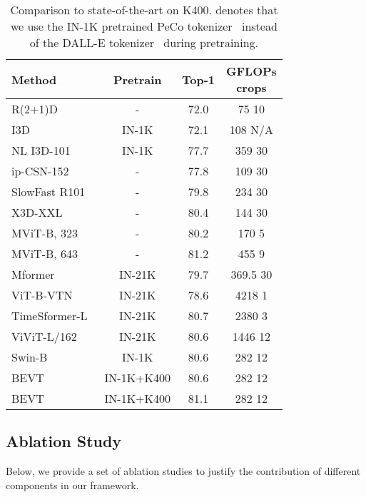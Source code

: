 \documentclass[10pt,twocolumn,letterpaper]{article}
\newcommand{\kn}{{\scshape K400}\xspace}
\newcommand{\ra}[1]{\renewcommand{\arraystretch}{#1}}
\begin{document}
\begin{table}
  \centering
\setlength{\tabcolsep}{0pt} \ra{1.0}
  \begin{tabular*}{\linewidth}{@{\extracolsep{\fill}}lccc@{}}
    \toprule
    Method & Pretrain & Top-1 & \makecell[c]{GFLOPs \\  crops} \\
    \midrule
    R(2+1)D~\cite{r21d} & - & 72.0 & 75  10 \\
    I3D~\cite{quovadis} & IN-1K & 72.1 & 108  N/A \\
    NL I3D-101~\cite{nonlocal} & IN-1K & 77.7 & 359  30 \\
    ip-CSN-152~\cite{tran2019video} & - & 77.8 & 109  30 \\
    SlowFast R101~\cite{slowfast} & - & 79.8 & 234  30 \\
    X3D-XXL~\cite{x3d} & - & 80.4 & 144  30 \\
    \midrule
    MViT-B, 323~\cite{fan2021multiscale} & - & 80.2 & 170  5 \\
    MViT-B, 643~\cite{fan2021multiscale} & - & 81.2 & 455  9 \\
    Mformer~\cite{patrick2021keeping} & IN-21K & 79.7 & 369.5  30 \\
    ViT-B-VTN~\cite{neimark2021video} & IN-21K & 78.6 & 4218  1 \\
    TimeSformer-L~\cite{gberta_2021_ICML} & IN-21K & 80.7 & 2380  3 \\
    ViViT-L/162~\cite{arnab2021vivit} & IN-21K & 80.6 & 1446  12 \\
Swin-B~\cite{liu2021video} & IN-1K & 80.6 & 282  12 \\
    \midrule
BEVT & IN-1K+K400 & 80.6 & 282  12 \\
    BEVT  & IN-1K+K400 & 81.1 & 282  12 \\
    \bottomrule
  \end{tabular*}
  \caption{Comparison to state-of-the-art on \kn.  denotes that we use the IN-1K pretrained PeCo tokenizer~\cite{dong2021peco} instead of the DALL-E tokenizer~\cite{dalle} during pretraining.}
  \label{tab:k400}
  \vspace{-1em}
\end{table}




\subsection{Ablation Study}
Below, we provide a set of ablation studies to justify the contribution of different components in our framework.
\end{document}
